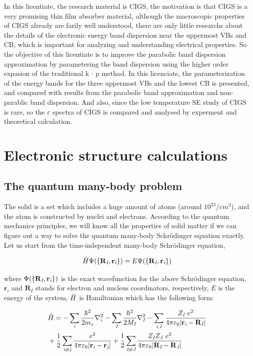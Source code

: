 \documentclass[a4paper]{report}
\begin{document}
In this licentiate, the research material is CIGS, the motivation is that CIGS is a very promising thin film absorber material, although the macroscopic properties of CIGS already
are farily well understood, there are only little researchs about the details of the electronic energy band dispersion near the uppermost VBs and CB, which is important
for analyzing and understanding electrical properties. So the objective of this licentiate is to improve the parabolic band dispersion approximation by parametering the band dispersion using the higher order expasion of the traditional k $\cdot$ p method. In this
licenciate, the parameterization of the energy bands for the three uppermost VBs and the lowest CB is presented, and compared with results from the parabolic band approximation
and non-parablic band dispersion. And also, since the low temperature SE study of CIGS is rare, so the ${\varepsilon}$ spectra of CIGS is compared and analysed by 
experment and theoretical calculation. 





\chapter{Electronic structure calculations }
\label{ch:dft}

\section{The quantum many-body problem}
\label{ch:mb}

\noindent The solid is a set which includes a huge amount of atoms (around $10^{23}/cm^3$), and the atom is constructed by nuclei and electrons. 
According to the quantum mechanics principles, we will know all the properties of solid matter if we can figure out a way to solve 
the quantum many-body Schrödinger equation exactly. Let us start from the time-independent many-body Schrödinger equation,

 
\begin{equation}\label{ssth}
 {\hat{H}} {\Psi(\{\bf{R}_\textit{I}, \bf{r}_\textit{i} \})} = {E} {\Psi(\{\bf{R}_\textit{I}, \bf{r}_\textit{i} \})}
\end{equation}

\noindent where $\Psi(\{\bf{R}_\textit{I}, \bf{r}_\textit{i} \})$  is the exact wavefunction for the above Schrödinger equation, $\textbf{r}_\textit{i}$ and $\textbf{R}_\textit{I}$  stands for electron and nucleus coordinators,
respectively, $E$ is the energy of the system, $\hat{H}$ is Hamiltonian which has the following form:

\begin{equation}\label{th}\begin{split}
&\hath = - \sumi<i> {\frac{\hbar^{2}}{2 m_\textit{e}}}   \nablai2<i> - \sumi<I> {\frac{\hbar^{2}}{2 M_\textit{I}}} \nablai2<I>  - \sumij<i><I> \frac{Z_\textit{I}\ e^2}{4 \pi \varepsilon_0 |\textbf{r}_\textit{i}-\textbf{R}_\textit{I}|} \\
& + \frac{1}{2} \suminj<i><j> \frac{ e^2}{4 \pi \varepsilon_0 |\textbf{r}_\textit{i}-\textbf{r}_\textit{j}|} + \frac{1}{2} \suminj<I><J> \frac{Z_\textit{I} Z_\textit{J}\  e^2}{4 \pi \varepsilon_0 |\textbf{R}_\textit{I}-\textbf{R}_\textit{J}|}
\end{split}\end{equation}
\end{document}
